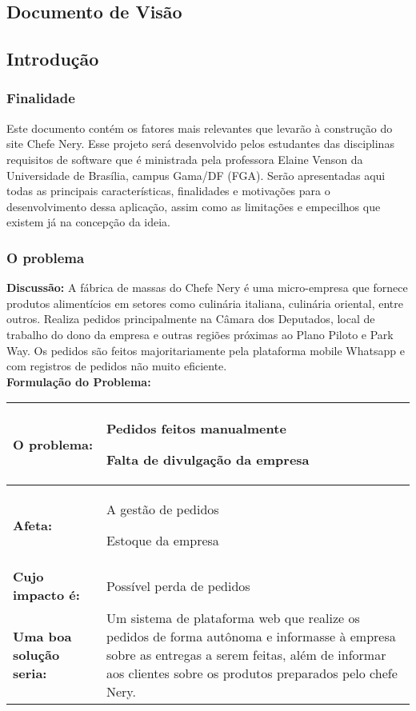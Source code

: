 \begin{apendicesenv}

\partapendices

\chapter{Documento de Visão}

{\large {\section { Introdução \\ } } }

{\subsection {Finalidade\\ }}
\tab Este documento contém os fatores mais relevantes que levarão à construção do site Chefe Nery. Esse projeto será desenvolvido pelos estudantes das disciplinas requisitos de software que é ministrada pela professora Elaine Venson da Universidade de Brasília, campus Gama/DF (FGA). Serão apresentadas aqui todas as principais características, finalidades e motivações para o desenvolvimento dessa aplicação, assim como as limitações e empecilhos que existem já na concepção da ideia.
\\

{\subsection {O problema\\ }}
\textbf{Discussão:} A fábrica de massas do Chefe Nery é uma micro-empresa que fornece produtos alimentícios em setores como culinária italiana, culinária oriental, entre outros. Realiza pedidos principalmente na Câmara dos Deputados, local de trabalho do dono da empresa e outras regiões próximas ao Plano Piloto e Park Way. Os pedidos são feitos majoritariamente pela plataforma mobile Whatsapp e com registros de pedidos não muito eficiente. \\
\textbf{Formulação do Problema:} 


\newcommand{\nextitem}{\par\hspace*{\labelsep}\textbullet\hspace*{\labelsep}}

\begin{tabular}{|l|p{3in}|}
  \hline
  \textbf{O problema:} & \nextitem Pedidos feitos manualmente
    \nextitem Falta de divulgação da empresa 
    \\ \hline
  \textbf{Afeta:} & \nextitem A gestão de pedidos 
    \nextitem Estoque da empresa 
    \\ \hline
  \textbf{Cujo impacto é:} & \nextitem Possível perda de pedidos
    \\ \hline
  \textbf{Uma boa solução seria:} & \nextitem Um sistema de plataforma web que realize os pedidos de forma autônoma e informasse à empresa sobre as entregas a serem feitas, além de informar aos clientes sobre os produtos preparados pelo chefe Nery.
    \\ \hline


\end{tabular}
\end{apendicesenv}
